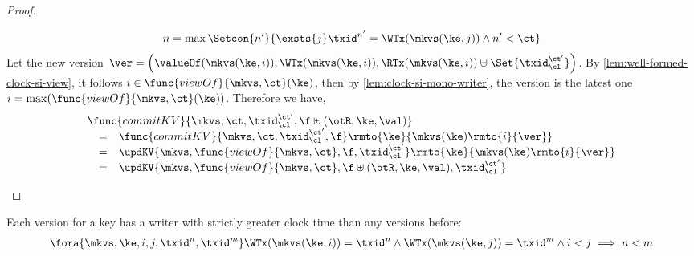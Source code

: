 \begin{proof}
\begin{itemize}
\[                n = \max\Setcon{n'}{%
                    \exsts{j} 
                    \txid^{n'} = \WTx(\mkvs(\ke, j)) 
                    \land n' < \ct%
                } 
            \]
            Let the new version \( \ver = \left( \valueOf(\mkvs(\ke,i)), \WTx(\mkvs(\ke,i)), \RTx(\mkvs(\ke,i)) \uplus \Set{\txid_\cl^{\ct'}} \right) \).
            By \cref{lem:well-formed-clock-si-view}, it follows \( i \in \func{viewOf}{\mkvs,\ct}(\ke) \), then by \cref{lem:clock-si-mono-writer}, the version is the latest one \( i = \max(\func{viewOf}{\mkvs,\ct}(\ke)) \).
            Therefore we have,
            \[
                \begin{array}{@{}l@{}}
                \func{commitKV}{\mkvs,\ct,\txid_\cl^{\ct'},\f \uplus (\otR, \ke, \val)}  \\
                \quad \begin{array}[t]{@{}c l@{}}
                = &
                \func{commitKV}{\mkvs,\ct,\txid_\cl^{\ct'},\f}\rmto{\ke}{\mkvs(\ke)\rmto{i}{\ver}} \\
                = & 
                \updKV{\mkvs,\func{viewOf}{\mkvs,\ct},\f,\txid_\cl^{\ct'}}\rmto{\ke}{\mkvs(\ke)\rmto{i}{\ver}} \\
                = & 
                \updKV{\mkvs,\func{viewOf}{\mkvs,\ct},\f \uplus (\otR, \ke, \val),\txid_\cl^{\ct'}}
                \end{array}
                \end{array}
            \]
    \end{itemize}
\end{proof}

\begin{lemma}
    \label{lem:clock-si-mono-writer}
    Each version for a key has a writer with strictly greater clock time than any versions before:
    \[
        \begin{array}{@{}l@{}}
            \fora{\mkvs,\ke,i,j,\txid^n,\txid^m} 
            \WTx(\mkvs(\ke,i)) = \txid^n 
            \land \WTx(\mkvs(\ke,j)) = \txid^m 
            \land i < j
            \implies 
            n < m
        \end{array}
    \]
\end{lemma}

